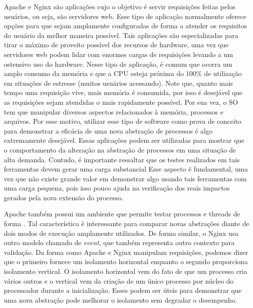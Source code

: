 Apache e Nginx são aplicações cujo o objetivo é servir requisições feitas
pelos usuários, ou seja, são servidores web. Esse tipo de aplicação normalmente
oferece opções para que sejam amplamente configuradas de forma a atender os
requisitos do usuário da melhor maneira possível. Tais aplicações são
especializadas para tirar o máximo de proveito possível dos recursos de hardware,
uma vez que servidores web podem lidar com enormes cargas de requisições
levando a um ostensivo uso do hardware. Nesse tipo de aplicação, é comum que
ocorra um amplo consumo da memória e que a CPU esteja próxima do 100\% de
utilização em situações de estresse (muitos usuários acessando).  Note que, quanto
mais tempo uma requisição vive, mais memória é consumida, por isso é desejável
que as requisições sejam atendidas o mais rapidamente possível. Por sua vez, o
SO tem que manipular diversos aspectos relacionados à memória, processos e
arquivos. Por esse motivo, utilizar esse tipo de software como prova de
conceito para demonstrar a eficácia de uma nova abstração de processos é algo
extremamente desejável. Essas aplicações podem ser utilizadas para mostrar que
o comportamento da alteração na abstração de processos em uma situação de alta
demanda. Contudo, é importante ressaltar que os testes realizados em tais
ferramentas devem gerar uma carga substancial  Esse aspecto é fundamental, uma vez que não existe
grande valor em demonstrar algo usando tais ferramentas com uma carga pequena,
pois isso pouco ajuda na verificação dos reais impactos gerados pela nova
extensão do processo.

Apache também possui um ambiente que permite testar processos e threads de
forma . Tal característica é interessante para comparar novas
abstrações diante de dois modos de execução amplamente utilizados. De forma
similar, o Nginx usa outro modelo chamado de \emph{event}, que também
representa outro contexto para validação. Da forma como Apache e Nginx
manipulam requisições, podemos dizer que o primeiro fornece um isolamento
horizontal enquanto o segundo proporciona isolamento vertical. O isolamento
horizontal vem do fato de que um processo cria vários outros e o vertical vem
da criação de um único processo por núcleo do processador durante a
inicialização. Esses  podem ser úteis para demonstrar
que uma nova abstração pode melhorar o isolamento sem degradar o desempenho.

